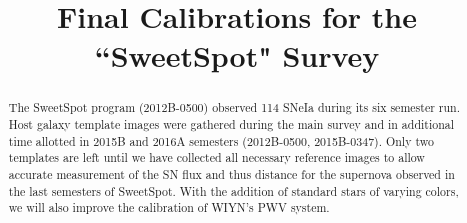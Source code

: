 \documentclass[11pt]{article}
\begin{document}
%
%

\title{Final Calibrations for the ``SweetSpot" Survey}



%


\begin{abstract}

The SweetSpot program (2012B-0500) observed 114 SNeIa during its six semester run. 
Host galaxy template images were gathered during the main survey and in additional time allotted in 2015B and 2016A semesters (2012B-0500, 2015B-0347). 
Only two templates are left until we have collected all necessary reference images to allow accurate measurement of the SN flux and thus distance for the supernova observed in the last semesters of SweetSpot.
With the addition of standard stars of varying colors, we will also improve the calibration of WIYN's PWV system. 

\end{abstract}

\end{document}
